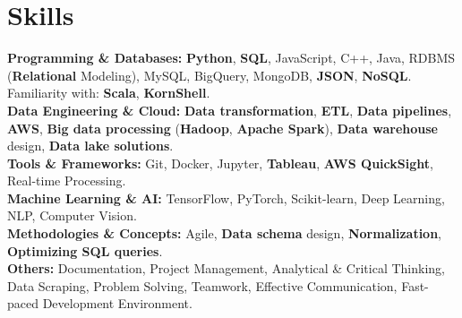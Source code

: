 \documentclass[a4paper,10pt]{article}
\begin{document}
\section*{Skills}
\textbf{Programming \& Databases: } \textbf{Python}, \textbf{SQL}, JavaScript, C++, Java, RDBMS (\textbf{Relational} Modeling), MySQL, BigQuery, MongoDB, \textbf{JSON}, \textbf{NoSQL}. Familiarity with: \textbf{Scala}, \textbf{KornShell}. \\
\textbf{Data Engineering \& Cloud:} \textbf{Data transformation}, \textbf{ETL}, \textbf{Data pipelines}, \textbf{AWS}, \textbf{Big data processing} (\textbf{Hadoop}, \textbf{Apache Spark}), \textbf{Data warehouse} design, \textbf{Data lake solutions}. \\
\textbf{Tools \& Frameworks:} Git, Docker, Jupyter, \textbf{Tableau}, \textbf{AWS QuickSight}, Real-time Processing. \\
\textbf{Machine Learning \& AI:} TensorFlow, PyTorch, Scikit-learn, Deep Learning, NLP, Computer Vision. \\
\textbf{Methodologies \& Concepts:} Agile, \textbf{Data schema} design, \textbf{Normalization}, \textbf{Optimizing SQL queries}. \\
\textbf{Others: } Documentation, Project Management, Analytical \& Critical Thinking, Data Scraping, Problem Solving, Teamwork, Effective Communication, Fast-paced Development Environment. \\

\vspace{-4mm}
\end{document}
